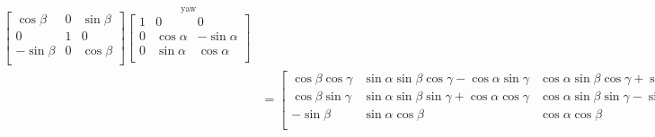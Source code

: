 \begin{align}
{\begin{bmatrix}
    \cos \beta & 0 & \sin \beta \\
     0         & 1 &  0 \\
   -\sin \beta & 0 & \cos \beta \\
  \end{bmatrix}}
  \overset{\text{yaw}}
  {\begin{bmatrix}
    1 &  0          &   0 \\
    0 & \cos \alpha & -\sin \alpha \\
    0 & \sin \alpha &  \cos \alpha \\
  \end{bmatrix}} \\
  &= \begin{bmatrix}
    \cos\beta\cos\gamma & \sin\alpha\sin\beta\cos\gamma - \cos\alpha\sin\gamma & \cos\alpha\sin\beta\cos\gamma + \sin\alpha\sin\gamma \\
    \cos\beta\sin\gamma & \sin\alpha\sin\beta\sin\gamma + \cos\alpha\cos\gamma & \cos\alpha\sin\beta\sin\gamma - \sin\alpha\cos\gamma \\
    -\sin\beta          & \sin\alpha\cos\beta                                  & \cos\alpha\cos\beta \\
  \end{bmatrix}
\end{align}